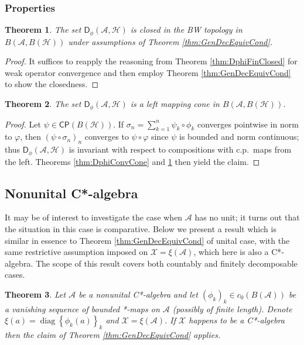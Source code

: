 \documentclass[reqno]{amsart}
\newtheorem{theorem}{Theorem}
\theoremstyle{plain}
\numberwithin{equation}{section}
\numberwithin{theorem}{section}
\numberwithin{lemma}{section}
\numberwithin{definition}{section}
\numberwithin{corollary}{section}
\numberwithin{remark}{section}
\newcommand{\hilbert}{\mathcal{H}}
\newcommand{\cpe}[1]{\mathsf{CP}(#1)}
\newcommand{\gdec}[3]{\mathsf{D}_{#1}(#2,#3)}
\begin{document}
\subsubsection{Properties}

\begin{theorem}\label{thm:DphiContNormClosed}
    The set $\gdec{\phi}{\mathscr{A}}{\hilbert}$ is closed in the BW topology in $B(\mathscr{A},B(\hilbert))$ under assumptions of Theorem \ref{thm:GenDecEquivCond}.
\end{theorem}

\begin{proof}
It suffices to reapply the reasoning from Theorem \ref{thm:DphiFinClosed} for weak operator convergence and then employ Theorem \ref{thm:GenDecEquivCond} to show the closedness.
\end{proof}

\begin{theorem}\label{thm:DphiCountMapCone}
    The set $\gdec{\phi}{\mathscr{A}}{\hilbert}$ is a left mapping cone in $B(\mathscr{A},B(\hilbert))$.
\end{theorem}

\begin{proof}
    Let $\psi \in \cpe{B(\hilbert)}$. If $\sigma_n = \sum_{k=1}^{n}\psi_k \circ \phi_k$ converges pointwise in norm to $\varphi$, then $\left(\psi\circ\sigma_n\right)_n$ converges to $\psi\circ\varphi$ since $\psi$ is bounded and norm continuous; thus $\gdec{\phi}{\mathscr{A}}{\hilbert}$ is invariant with respect to compositions with c.p.~maps from the left. Theorems \ref{thm:DphiConvCone} and \ref{thm:DphiContNormClosed} then yield the claim.
\end{proof}

\subsection{Nonunital C*-algebra}
\label{sec:GDMnonunital}

It may be of interest to investigate the case when $\mathscr{A}$ has no unit; it turns out that the situation in this case is comparative. Below we present a result which is similar in essence to Theorem \ref{thm:GenDecEquivCond} of unital case, with the same restrictive assumption imposed on $\mathscr{X} = \xi(\mathscr{A})$, which here is also a C*-algebra. The scope of this result covers both countably and finitely decomposable cases.

\begin{theorem}\label{thm:GenDecEquivCondNonunital}
    Let $\mathscr{A}$ be a nonunital C*-algebra and let $\left(\phi_k\right)_{k} \in c_0 (B(\mathscr{A}))$ be a vanishing sequence of bounded *-maps on $\mathscr{A}$ (possibly of finite length). Denote $\xi(a) = \operatorname{diag}{\left\{ \phi_k (a) \right\}_{k}}$ and $\mathscr{X} = \xi(\mathscr{A})$. If $\mathscr{X}$ happens to be a C*-algebra then the claim of Theorem \ref{thm:GenDecEquivCond} applies.
\end{theorem}
\end{document}
